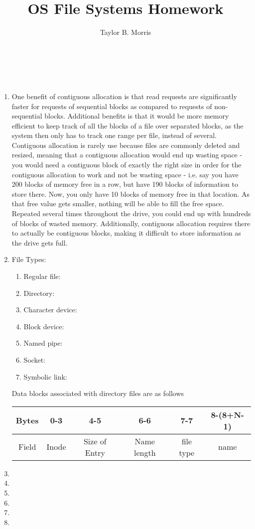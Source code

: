 \documentclass[12pt,letterpaper]{report}
\author{Taylor B. Morris}
\title{OS File Systems Homework}
\begin{document}
\makeatletter
{\huge\noindent\@title\large\\\@author\\\@date}
\makeatother
\begin{enumerate}

\item One benefit of contiguous allocation is that read requests are significantly 
faster for requests of sequential blocks as compared to requests of non-sequential 
blocks. Additional benefits is that it would be more memory efficient to keep track of 
all the blocks of a file over separated blocks, as the system then only has to track
one range per file, instead of several. Contiguous allocation is rarely use because
files are commonly deleted and resized, meaning that a contiguous allocation would end
up wasting space - you would need a contiguous block of exactly the right size in order
for the contiguous allocation to work and not be wasting space - i.e. say you have 200
blocks of memory free in a row, but have 190 blocks of information to store there. Now,
you only have 10 blocks of memory free in that location. As that free value gets smaller,
nothing will be able to fill the free space. Repeated several times throughout the drive,
you could end up with hundreds of blocks of wasted memory. Additionally, contiguous
allocation requires there to actually be contiguous blocks, making it difficult to store
information as the drive gets full.

\item File Types: 
\begin{enumerate}[{(Type }1{)}]
\item Regular file: 
\item Directory: 
\item Character device: 
\item Block device:
\item Named pipe:
\item Socket:
\item Symbolic link:
\end{enumerate}

Data blocks associated with directory files are as follows\\
\begin{tabular}{|c|c|c|c|c|c|}
\hline
Bytes & 0-3 & 4-5 & 6-6 & 7-7 & 8-(8+N-1) \\
\hline
Field & Inode & Size of Entry & Name length & file type & name\\
\hline
\end{tabular}
\item

\item

\item

\item

\item

\item



\end{enumerate}
\end{document}
